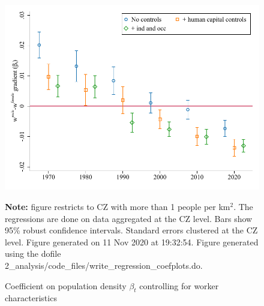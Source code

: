 \begin{figure}[!h]
\centering
\caption{Coefficient on population density $ \beta_t $ controlling for worker characteristics}
\includegraphics[width=1\textwidth]{../2_analysis/output/figures/with_ind_gradients_individual_l_czone_density_full_time}
\par \begin{minipage}[h]{\textwidth}{\tiny\textbf{Note:} figure restricts to CZ with more than 1 people per km$^2$. The regressions are done on data aggregated at the CZ level. Bars show 95\% robust confidence intervals. Standard errors clustered at the CZ level. Figure generated on 11 Nov 2020 at 19:32:54. Figure generated using the dofile 2\_analysis/code\_files/write\_regression\_coefplots.do.}\end{minipage}
\end{figure}
